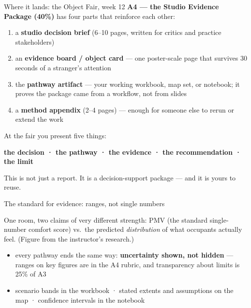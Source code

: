 \documentclass[aspectratio=169,10pt]{beamer}
\newcommand{\muted}[1]{{\color{cMute}#1}}
\begin{document}
\begin{frame}{Where it lands: the Object Fair, week 12}
  \textbf{A4 --- the Studio Evidence Package (40\%)} has four parts that
  reinforce each other:
  \begin{enumerate}
    \item a \textbf{studio decision brief} (6--10 pages, written for critics
          and practice stakeholders)
    \item an \textbf{evidence board / object card} --- one poster-scale page
          that survives 30 seconds of a stranger's attention
    \item the \textbf{pathway artifact} --- your working workbook, map set, or
          notebook; \muted{it proves the package came from a workflow, not
          from slides}
    \item a \textbf{method appendix} (2--4 pages) --- enough for someone else
          to rerun or extend the work
  \end{enumerate}
  \vspace{2mm}
  At the fair you present five things:
  \begin{center}
    \textbf{the decision · the pathway · the evidence · the recommendation · the limit}
  \end{center}
  \vspace{1mm}
  This is not just a report. It is a decision-support package --- and it is
  yours to reuse.
\end{frame}

\begin{frame}{The standard for evidence: ranges, not single numbers}
  \begin{center}
  \end{center}
  \vspace{.5mm}
  {\scriptsize One room, two claims of very different strength: PMV
  (the standard single-number comfort score) vs.\ the predicted
  \emph{distribution} of what occupants actually feel.
  \muted{(Figure from the instructor's research.)}\par}
  \vspace{.5mm}
  \begin{itemize}
    \item every pathway ends the same way: \textbf{uncertainty shown, not
          hidden} --- ranges on key figures are in the A4 rubric, and
          transparency about limits is 25\% of A3
    \item \textcolor{cSheet}{scenario bands} in the workbook ·
          \textcolor{cGIS}{stated extents and assumptions} on the map ·
          \textcolor{cPy}{confidence intervals} in the notebook
  \end{itemize}
\end{frame}
\end{document}
